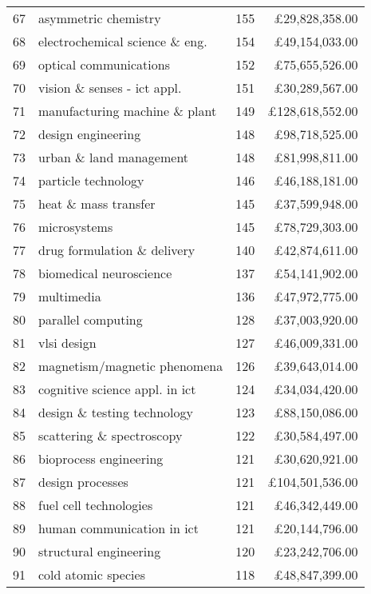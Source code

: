 \begin{spacing}{0.9}
\begin{longtable}[c]{r|>{\raggedleft\arraybackslash}m{6.5cm}|>{\raggedleft\arraybackslash}m{1.9cm}|r}
{67} & {asymmetric chemistry} & {155} & {\pounds29,828,358.00}\\
{68} & {electrochemical science \& eng.} & {154} & {\pounds49,154,033.00}\\
{69} & {optical communications} & {152} & {\pounds75,655,526.00}\\
{70} & {vision \& senses - ict appl.} & {151} & {\pounds30,289,567.00}\\
{71} & {manufacturing machine \& plant} & {149} & {\pounds128,618,552.00}\\
{72} & {design engineering} & {148} & {\pounds98,718,525.00}\\
{73} & {urban \& land management} & {148} & {\pounds81,998,811.00}\\
{74} & {particle technology} & {146} & {\pounds46,188,181.00}\\
{75} & {heat \& mass transfer} & {145} & {\pounds37,599,948.00}\\
{76} & {microsystems} & {145} & {\pounds78,729,303.00}\\
{77} & {drug formulation \& delivery} & {140} & {\pounds42,874,611.00}\\
{78} & {biomedical neuroscience} & {137} & {\pounds54,141,902.00}\\
{79} & {multimedia} & {136} & {\pounds47,972,775.00}\\
{80} & {parallel computing} & {128} & {\pounds37,003,920.00}\\
{81} & {vlsi design} & {127} & {\pounds46,009,331.00}\\
{82} & {magnetism/magnetic phenomena} & {126} & {\pounds39,643,014.00}\\
{83} & {cognitive science appl. in ict} & {124} & {\pounds34,034,420.00}\\
{84} & {design \& testing technology} & {123} & {\pounds88,150,086.00}\\
{85} & {scattering \& spectroscopy} & {122} & {\pounds30,584,497.00}\\
{86} & {bioprocess engineering} & {121} & {\pounds30,620,921.00}\\
{87} & {design processes} & {121} & {\pounds104,501,536.00}\\
{88} & {fuel cell technologies} & {121} & {\pounds46,342,449.00}\\
{89} & {human communication in ict} & {121} & {\pounds20,144,796.00}\\
{90} & {structural engineering} & {120} & {\pounds23,242,706.00}\\
{91} & {cold atomic species} & {118} & {\pounds48,847,399.00}\\

\end{longtable}
\end{spacing}
